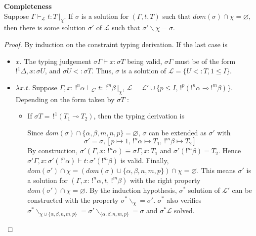 \begin{prop}{\bf Completeness} \\
	Suppose $\Gamma \vdash_\mathcal{L} t : T ~|_\chi$. If $\sigma$ is a solution for $(\Gamma, t, T)$ such that
	$dom(\sigma) \cap \chi = \varnothing$, then there 	is some solution $\sigma'$ of $\mathcal{L}$ such that
	$\sigma' \backslash \chi = \sigma$.
	
	\begin{proof}
		By induction on the constraint typing derivation. If the last case is
		\begin{itemize}
		\item $x$. The typing judgement $\sigma \Gamma \vdash x : \sigma T$ being valid, $\sigma \Gamma$ must be of the form
			$!^1 \Delta, x : \sigma U$, and $\sigma U <: \sigma T$. Thus, $\sigma$ is a solution of $\mathcal{L} = \{ U <: T, 1 \le I \}$.
			
		\item $\lambda x.t$. Suppose $\Gamma, x : \,!^n\alpha \vdash_\mathcal{L'} t : \,!^m\beta ~|_\chi$, $\mathcal{L} = \mathcal{L'} \cup
			\{ p \le I, \,!^p(!^n\alpha \multimap !^m\beta) \}$.
			Depending on the form taken by $\sigma T$ :
			\begin{itemize}
			\item If $\sigma T = \,!^1 (T_1 \multimap T_2)$, then the typing derivation is
				\begin{prooftree}
				\end{prooftree}
				Since $dom(\sigma) \cap \{\alpha, \beta, m, n, p\} = \varnothing$, $\sigma$ can be extended as $\sigma'$ with
					$$\sigma' = \sigma, [p \mapsto 1, \,!^n\alpha \mapsto T_1, \,!^m\beta \mapsto T_2]$$
				By construction, $\sigma' (\Gamma, x : \,!^n\alpha) \equiv \sigma\Gamma, x : T_1$ and $\sigma' (!^m \beta) = T_2$. Hence
				$\sigma' \Gamma, x : \sigma'(!^n\alpha) \vdash t : \sigma'(!^m \beta)$ is valid. Finally,
				$dom(\sigma') \cap \chi = (dom(\sigma) \cup \{\alpha, \beta, n, m, p\}) \cap \chi = \varnothing$.
				This means $\sigma'$ is a solution for $(\Gamma,x : \,!^n\alpha, t, \,!^m\beta)$ with the right property
				$dom(\sigma') \cap \chi = \varnothing$. By the induction hypothesis, $\sigma^*$ solution of $\mathcal{L'}$ can be constructed
				with the property $\sigma^* \backslash_\chi = \sigma'$.
				$\sigma^*$ also verifies $\sigma^*\backslash_{\chi \cup \{\alpha, \beta, n, m , p\}} =
				\sigma' \backslash_{\{\alpha, \beta, n, m, p \}} = \sigma$ and $\sigma^* \mathcal{L}$ solved. \\
					

\end{itemize}
\end{itemize}
\end{proof}
\end{prop}

